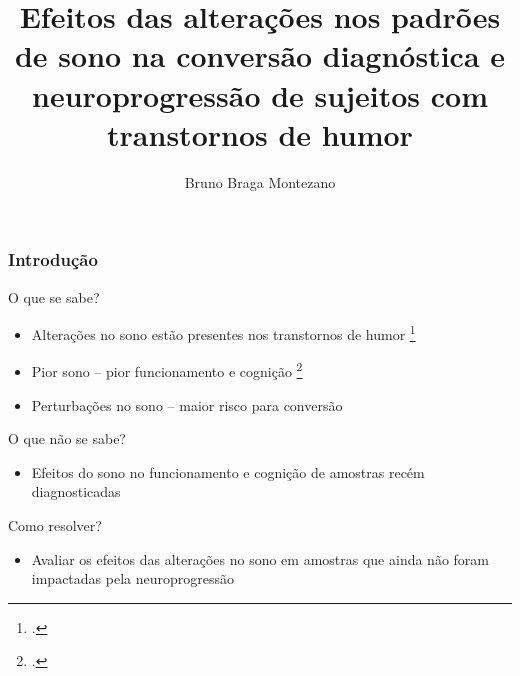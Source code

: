 \documentclass{beamer}
\title{Efeitos das alterações nos padrões de sono na conversão diagnóstica e
       neuroprogressão de sujeitos com transtornos de humor}
\author[Bruno Montezano]{Bruno Braga Montezano}
\institute{Universidade Católica de Pelotas}
\begin{document}
\begin{frame}

\maketitle

\end{frame}

\begin{frame}
\frametitle{Introdução}

    \begin{block}{O que se sabe?}

        \begin{itemize}

            \item Alterações no sono estão presentes nos transtornos de humor
            \footcite{ritter_disturbed_2015}
            \item Pior sono -- pior funcionamento e cognição
            \footcite{lai_familiality_2014,
            kaplan_sleep_2020,
            slyepchenko_association_2019,
            kanady_association_2017}
            \item Perturbações no sono -- maior risco para
            conversão\footnotemark[1]
        
        \end{itemize}

    \end{block}

    \begin{block}{O que não se sabe?}

        \begin{itemize}

            \item Efeitos do sono no funcionamento e cognição de amostras recém
            diagnosticadas

        \end{itemize}

    \end{block}

    \begin{block}{Como resolver?}

        \begin{itemize}

            \item Avaliar os efeitos das alterações no sono em
            amostras que ainda não foram impactadas pela neuroprogressão

        \end{itemize}

    \end{block}


\end{frame}
\end{document}
